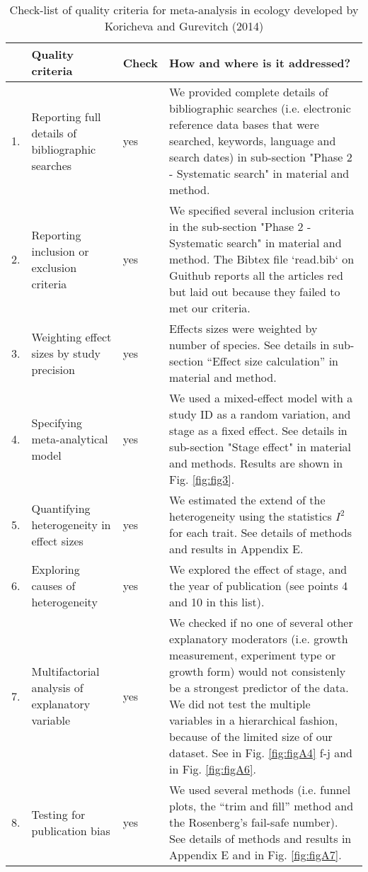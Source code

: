 \documentclass[a4paper,11pt]{article}
\begin{document}
\clearpage
\begin{table}[h!]
\centering
\caption{Check-list of quality criteria for meta-analysis in ecology developed by Koricheva and Gurevitch (2014) }
{\footnotesize
\vspace{0.5cm}
\begin{tabular}{p{0.2cm}p{4cm}p{0.8cm}p{7cm}}
  \hline
  & Quality criteria & Check & How and where is it addressed? \\
  \hline
  1.& Reporting full details of bibliographic searches & yes	& We provided complete details of bibliographic searches (i.e. electronic reference data bases that were searched, keywords, language and search dates) in sub-section "Phase 2 - Systematic search" in material and method.\\
  2.& Reporting inclusion or exclusion criteria & yes & We specified several inclusion criteria in the sub-section "Phase 2 - Systematic search" in material and method. The Bibtex file `read.bib` on Guithub reports all the articles red but laid out because they failed to met our criteria.\\
  3.& Weighting effect sizes by study precision & yes & Effects sizes were weighted by number of species. See	 details in sub-section ``Effect size calculation'' in material and method.\\
 4.& Specifying meta-analytical model &	yes	& We used a mixed-effect model with a study ID as a random variation, and stage as a fixed effect. See details in sub-section "Stage effect" in material and methods. Results are shown in Fig. \ref{fig:fig3}.\\
 5.& Quantifying heterogeneity in effect sizes &	yes &	We estimated the extend of the heterogeneity using the statistics $I^{2}$ for each trait. See details of methods and results in Appendix E.\\
 6.& Exploring causes of heterogeneity & yes &	We explored the effect of stage, and the year of publication (see points 4 and 10 in this list). \\
 7.& Multifactorial analysis of explanatory variable	& yes & We checked if no one of several other explanatory moderators (i.e. growth measurement, experiment type or growth form) would not consistenly be a strongest predictor of the data. We did not test the multiple variables in a hierarchical fashion, because of the limited size of our dataset. See in Fig. \ref{fig:figA4} f-j and in Fig. \ref{fig:figA6}.\\
  8.& Testing for publication bias &	yes	& We used several methods (i.e. funnel plots, the ``trim and fill'' method and the Rosenberg’s fail-safe number). See details of methods and results in Appendix E and in Fig. \ref{fig:figA7}.\\

\end{tabular}}
\end{table}
\end{document}
